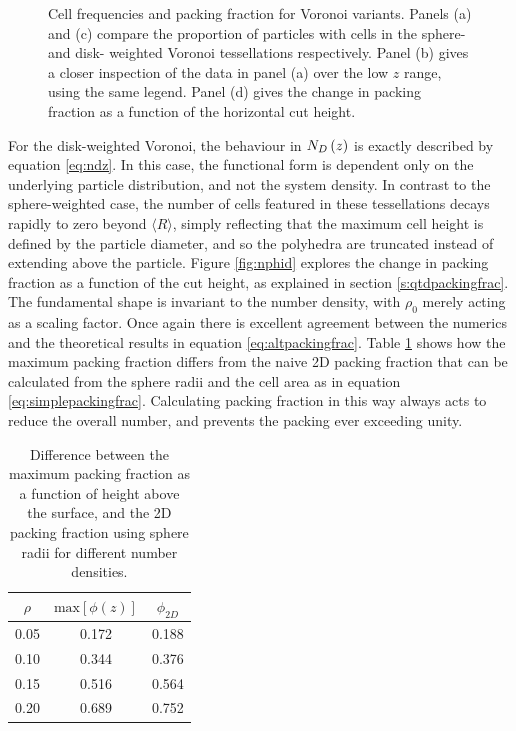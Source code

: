 \begin{figure}
	\caption{Cell frequencies and packing fraction for Voronoi variants. Panels (a) and (c) compare the proportion of particles with cells in the sphere\-- and disk\-- weighted Voronoi tessellations respectively.
	Panel (b) gives a closer inspection of the data in panel (a) over the low $z$ range, using the same legend.
	Panel (d) gives the change in packing fraction as a function of the horizontal cut height.}
	\label{fig:nphi}
\end{figure}

For the disk\--weighted Voronoi, the behaviour in $N_D\left(z\right)$ is exactly described by equation \eqref{eq:ndz}.
In this case, the functional form is dependent only on the underlying particle distribution, and not the system density. 
In contrast to the sphere\--weighted case, the number of cells featured in these tessellations decays rapidly to zero beyond $\langle R\rangle$, simply reflecting that the maximum cell height is defined by the particle diameter, and so the polyhedra are truncated instead of extending above the particle.
Figure \ref{fig:nphid} explores the change in packing fraction as a function of the cut height, as explained in section \ref{s:qtdpackingfrac}.
The fundamental shape is invariant to the number density, with $\rho_0$ merely acting as a scaling factor. 
Once again there is excellent agreement between the numerics and the theoretical results in equation \eqref{eq:altpackingfrac}.
Table \ref{tab:packingfrac} shows how the maximum packing fraction differs from the naive 2D packing fraction that can be calculated from the sphere radii and the cell area as in equation \eqref{eq:simplepackingfrac}.
Calculating packing fraction in this way always acts to reduce the overall number, and prevents the packing ever exceeding unity.

\begin{table}[h!]
\caption{Difference between the maximum packing fraction as a function of height above the surface, and the 2D packing fraction using sphere radii for different number densities.}
\label{tab:packingfrac}
\centering
\begin{tabular}{ccc}
	\toprule
        $\rho$ & $\text{max}\left[\phi\left(z\right)\right]$ & $\phi_{2D}$ \\
        \midrule
	0.05 & 0.172 & 0.188 \\
	0.10 & 0.344 & 0.376 \\
	0.15 & 0.516 & 0.564 \\
	0.20 & 0.689 & 0.752 \\
	\bottomrule
\end{tabular}
\end{table}

